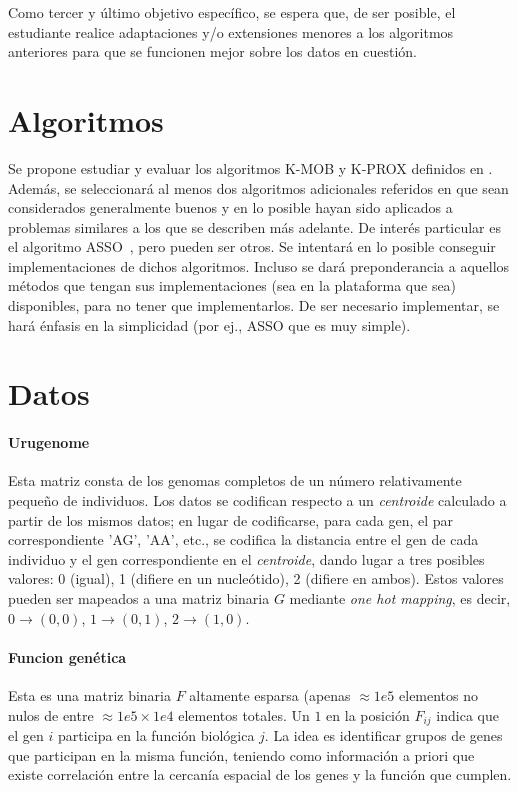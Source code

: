 \documentclass{article}
\theoremstyle{definition}
\begin{document}
Como tercer y último objetivo específico, se espera que, de ser posible, el estudiante realice adaptaciones y/o extensiones menores a los algoritmos anteriores para que se funcionen mejor sobre los datos en cuestión.


\section{Algoritmos}

Se propone estudiar y evaluar los algoritmos K-MOB y K-PROX definidos en \cite{bmf}. Además, se seleccionará al menos dos algoritmos adicionales referidos en \cite{bmf} que sean considerados generalmente buenos y en lo posible hayan sido aplicados a problemas similares a los que se describen más adelante. De interés particular es el algoritmo ASSO~\cite{asso}, pero pueden ser otros. Se intentará en lo posible conseguir implementaciones de dichos algoritmos. Incluso se dará preponderancia a aquellos métodos que tengan sus implementaciones (sea en la plataforma que sea) disponibles, para no tener que implementarlos.
De ser necesario implementar, se hará énfasis en la simplicidad (por ej., ASSO que es muy simple).

\section{Datos}

\paragraph{Urugenome} Esta matriz consta de los genomas completos de un número relativamente pequeño de individuos. Los datos se codifican respecto a un \emph{centroide} calculado a partir de los mismos datos; en lugar de codificarse, para cada gen, el  par correspondiente 'AG', 'AA', etc., se codifica la distancia entre el gen de cada individuo y el gen correspondiente en el \emph{centroide}, dando  lugar a tres posibles valores: 0 (igual), 1 (difiere en un nucleótido), 2 (difiere en ambos). Estos valores pueden ser mapeados a una matriz binaria $G$ mediante \emph{one hot mapping}, es decir, $0 \rightarrow (0,0)$, $1 \rightarrow (0,1)$, $2 \rightarrow (1,0)$.

\paragraph{Funcion genética} Esta es una matriz binaria $F$ altamente esparsa (apenas $\approx 1e5$ elementos no nulos de entre $\approx 1e5{\times}1e4$ elementos totales. Un $1$ en la posición $F_{ij}$ indica que el gen $i$ participa en la función biológica $j$. La idea es identificar grupos de genes que participan en la misma función, teniendo como información a priori que existe correlación entre la cercanía espacial de los genes y la función que cumplen.
\end{document}
